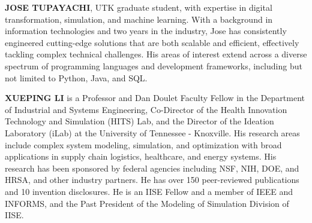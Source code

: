 \documentclass{scspaperproc}
\theoremstyle{scsthe}
\begin{document}
\textbf{\uppercase{Jose Tupayachi}}, UTK graduate student, with expertise in digital transformation, simulation, and machine learning. With a background in information technologies and two years in the industry, Jose has consistently engineered cutting-edge solutions that are both scalable and efficient, effectively tackling complex technical challenges. His areas of interest extend across a diverse spectrum of programming languages and development frameworks, including but not limited to Python, Java, and SQL.

\textbf{\uppercase{Xueping Li}} is a Professor and Dan Doulet Faculty Fellow in the Department of Industrial and Systems Engineering, Co-Director of the Health Innovation Technology and Simulation (HITS) Lab, and the Director of the Ideation Laboratory (iLab) at the University of Tennessee - Knoxville. His research areas include complex system modeling, simulation, and optimization with broad applications in supply chain logistics, healthcare, and energy systems. His research has been sponsored by federal agencies including NSF, NIH, DOE, and HRSA, and other industry partners. He has over 150 peer-reviewed publications and 10 invention disclosures. He is an IISE Fellow and a member of IEEE and INFORMS, and the Past President of the Modeling of Simulation Division of IISE.
\end{document}
